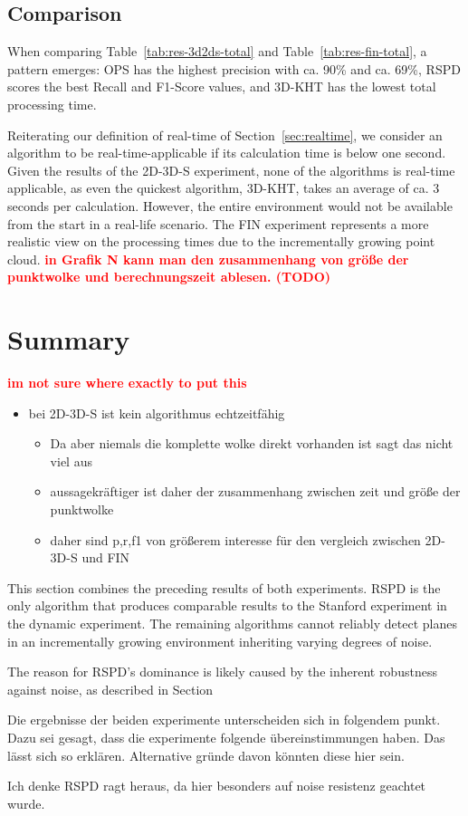 \documentclass[main.tex]{subfiles}
\begin{document}
\subsection{Comparison}
When comparing Table~\ref{tab:res-3d2ds-total} and Table~\ref{tab:res-fin-total}, a pattern emerges:
OPS has the highest precision with ca. 90\% and ca. 69\%, RSPD scores the best Recall and F1-Score values, and 3D-KHT has the lowest total
processing time.

Reiterating our definition of real-time of Section~\ref{sec:realtime}, we consider an algorithm to be real-time-applicable if its calculation time is below one second.
Given the results of the 2D-3D-S experiment, none of the algorithms is real-time applicable, as even the quickest algorithm, 3D-KHT, takes
an average of ca. 3 seconds per calculation.
However, the entire environment would not be available from the start in a real-life scenario. The FIN experiment represents a more realistic
view on the processing times due to the incrementally growing point cloud. \textbf{\textcolor{red}{in Grafik N kann man den zusammenhang
        von größe der punktwolke und berechnungszeit ablesen. (TODO)}}

\section{Summary}

\textbf{\textcolor{red}{im not sure where exactly to put this}}
\begin{itemize}
    \item bei 2D-3D-S ist kein algorithmus echtzeitfähig
          \begin{itemize}
              \item Da aber niemals die komplette wolke direkt vorhanden ist sagt das nicht viel aus
              \item aussagekräftiger ist daher der zusammenhang zwischen zeit und größe der punktwolke
              \item daher sind p,r,f1 von größerem interesse für den vergleich zwischen 2D-3D-S und FIN
          \end{itemize}
\end{itemize}


This section combines the preceding results of both experiments.
RSPD is the only algorithm that produces comparable results to the Stanford experiment in the dynamic experiment.
The remaining algorithms cannot reliably detect planes in an incrementally growing environment inheriting varying degrees of noise.

The reason for RSPD's dominance is likely caused by the inherent robustness against noise, as described in Section~

Die ergebnisse der beiden experimente unterscheiden sich in folgendem punkt. Dazu sei gesagt, dass die experimente folgende übereinstimmungen haben.
Das lässt sich so erklären. Alternative gründe davon könnten diese hier sein.

Ich denke RSPD ragt heraus, da hier besonders auf noise resistenz geachtet wurde. %
\end{document}

